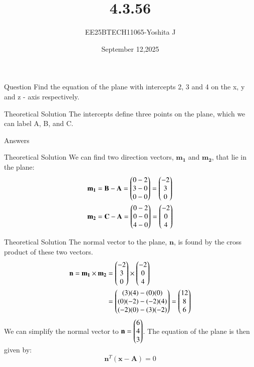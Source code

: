 \documentclass{beamer}
\begin{document}
\title 
{4.3.56}
\date{September 12,2025}


\author 
{EE25BTECH11065-Yoshita J}






\frame{\titlepage}
\begin{frame}{Question}
Find the equation of the plane with intercepts 2, 3 and 4 on the x, y and z - axis respectively.\\

\end{frame}


\begin{frame}{Theoretical Solution}
The intercepts define three points on the plane, which we can label A, B, and C.
\begin{table}[H]    
  \centering
  
  \caption{Answers}
  \label{Answers}
\end{table}
\end{frame}

\begin{frame}{Theoretical Solution}
We can find two direction vectors, $\mathbf{m_1}$ and $\mathbf{m_2}$, that lie in the plane:
\begin{align*}
    \mathbf{m_1} &= \mathbf{B} - \mathbf{A} = \begin{pmatrix}0-2\\3-0\\0-0\end{pmatrix} = \begin{pmatrix}-2\\3\\0\end{pmatrix} \\
    \mathbf{m_2} &= \mathbf{C} - \mathbf{A} = \begin{pmatrix}0-2\\0-0\\4-0\end{pmatrix} = \begin{pmatrix}-2\\0\\4\end{pmatrix}
\end{align*}
\end{frame}

\begin{frame}{Theoretical Solution}
The normal vector to the plane, $\mathbf{n}$, is found by the cross product of these two vectors.
\begin{align*}
    \mathbf{n} = \mathbf{m_1} \times \mathbf{m_2} &= \begin{pmatrix}-2\\3\\0\end{pmatrix} \times \begin{pmatrix}-2\\0\\4\end{pmatrix} \\
    &= \begin{pmatrix}(3)(4) - (0)(0) \\ (0)(-2) - (-2)(4) \\ (-2)(0) - (3)(-2)\end{pmatrix} = \begin{pmatrix}12\\8\\6\end{pmatrix}
\end{align*}
We can simplify the normal vector to $\mathbf{n} = \begin{pmatrix}6\\4\\3\end{pmatrix}$. The equation of the plane is then given by:
\[ \mathbf{n}^T (\mathbf{x} - \mathbf{A}) = 0 \]
\end{frame}
\end{document}

